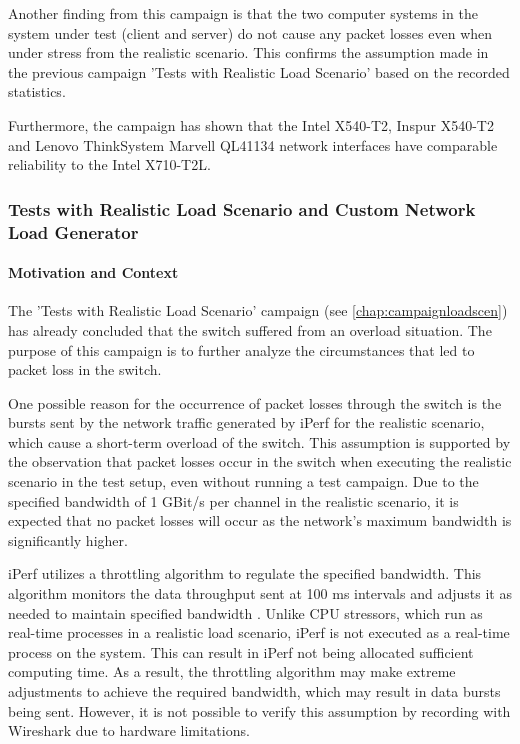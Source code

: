 Another finding from this campaign is that the two computer systems in the system under test (client and server) do not cause any packet losses even when under stress from the realistic scenario. This confirms the assumption made in the previous campaign 'Tests with Realistic Load Scenario' based on the recorded statistics.

Furthermore, the campaign has shown that the Intel X540-T2, Inspur X540-T2 and Lenovo ThinkSystem Marvell QL41134 network interfaces have comparable reliability to the Intel X710-T2L.

\subsubsection{Tests with Realistic Load Scenario and Custom Network Load Generator}
\paragraph{Motivation and Context}
The 'Tests with Realistic Load Scenario' campaign (see \ref{chap:campaignloadscen}) has already concluded that the switch suffered from an overload situation. The purpose of this campaign is to further analyze the circumstances that led to packet loss in the switch.

One possible reason for the occurrence of packet losses through the switch is the bursts sent by the network traffic generated by iPerf for the realistic scenario, which cause a short-term overload of the switch. This assumption is supported by the observation that packet losses occur in the switch when executing the realistic scenario in the test setup, even without running a test campaign. Due to the specified bandwidth of 1 GBit/s per channel in the realistic scenario, it is expected that no packet losses will occur as the network's maximum bandwidth is significantly higher.

iPerf utilizes a throttling algorithm to regulate the specified bandwidth. This algorithm monitors the data throughput sent at 100 ms intervals and adjusts it as needed to maintain specified bandwidth \cite{reli03}. Unlike CPU stressors, which run as real-time processes in a realistic load scenario, iPerf is not executed as a real-time process on the system. This can result in iPerf not being allocated sufficient computing time. As a result, the throttling algorithm may make extreme adjustments to achieve the required bandwidth, which may result in data bursts being sent. However, it is not possible to verify this assumption by recording with Wireshark due to hardware limitations.


